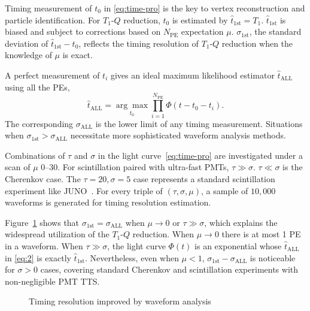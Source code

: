 Timing measurement of $t_0$ in \eqref{eq:time-pro} is the key to vertex reconstruction and particle identification.  For $T_1$-$Q$ reduction, $t_0$ is estimated by $\hat{t}_\mathrm{1st} = T_1$. $\hat{t}_\mathrm{1st}$ is biased and subject to corrections based on $N_\mathrm{PE}$ expectation $\mu$.  $\sigma_\mathrm{1st}$, the standard deviation of $\hat{t}_\mathrm{1st} - t_0$, reflects the timing resolution of $T_1$-$Q$ reduction when the knowledge of $\mu$ is exact.

A perfect measurement of $t_i$ gives an ideal maximum likelihood estimator $\hat{t}_\mathrm{ALL}$ using all the PEs,
\begin{equation}
  \label{eq:2}
  \hat{t}_\mathrm{ALL} = \underset{t_0}{\arg \max} \prod_{i=1}^{N_\mathrm{PE}} \Phi(t-t_0-t_i).
\end{equation}
The corresponding $\sigma_\mathrm{ALL}$ is the lower limit of any timing measurement.  Situations when $\sigma_\mathrm{1st} > \sigma_\mathrm{ALL}$ necessitate more sophisticated waveform analysis methods.

Combinations of $\tau$ and $\sigma$ in the light curve~\eqref{eq:time-pro} are investigated under a scan of $\mu$ \numrange{0}{30}. For scintillation paired with ultra-fast PMTs, $\tau \gg \sigma$.  $\tau \ll \sigma$ is the Cherenkov case.  The $\tau=20, \sigma=5$ case represents a standard scintillation experiment like JUNO~\cite{ludhova_particle_2020}.  For every triple of $(\tau, \sigma, \mu)$, a sample of $10,000$ waveforms is generated for timing resolution estimation.

Figure~\ref{fig:reso-diff} shows that $\sigma_{\mathrm{1st}}=\sigma_{\mathrm{ALL}}$ when $\mu \to 0$ or $\tau \gg \sigma$, which explains the widespread utilization of the $T_1$-$Q$ reduction.  When $\mu \to 0$ there is at most 1 PE in a waveform.  When $\tau \gg \sigma$, the light curve $\Phi(t)$ is an exponential whose $\hat{t}_\mathrm{ALL}$ in \eqref{eq:2} is exactly $\hat{t}_\mathrm{1st}$.  Nevertheless, even when $\mu < 1$, $\sigma_{\mathrm{1st}} - \sigma_{\mathrm{ALL}}$ is noticeable for $\sigma > 0$ cases, covering standard Cherenkov and scintillation experiments with non-negligible PMT TTS.
\begin{figure}[H]
    \centering
    \scalebox{0.5}{}
    \caption{\label{fig:reso-diff} Timing resolution improved by waveform analysis}
\end{figure}
